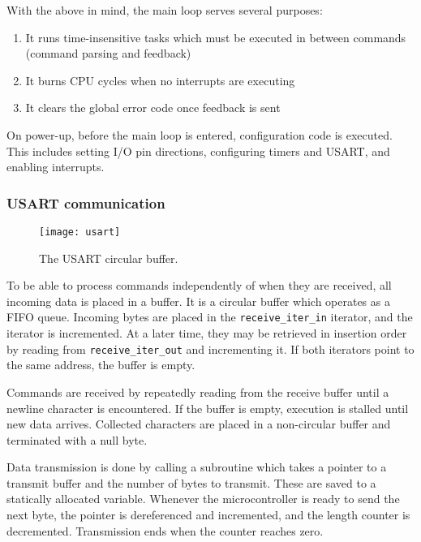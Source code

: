 With the above in mind, the main loop serves several purposes:
\begin{enumerate}
    \item It runs time-insensitive tasks which must be executed in between
    commands (command parsing and feedback)
    \item It burns CPU cycles when no interrupts are executing
    \item It clears the global error code once feedback is sent
\end{enumerate}

On power-up, before the main loop is entered, configuration code is executed.
This includes setting I/O pin directions, configuring timers and USART, and
enabling interrupts.

\subsubsection{USART communication}

\begin{figure}[ht]
    \begin{center}
        \texttt{[image: usart]}
        \caption{The USART circular buffer.}
    \end{center}
\end{figure}

To be able to process commands independently of when they are received, all
incoming data is placed in a buffer. It is a circular buffer which operates as a
FIFO queue. Incoming bytes are placed in the \texttt{receive\_iter\_in}
iterator, and the iterator is incremented. At a later time, they may be
retrieved in insertion order by reading from \texttt{receive\_iter\_out} and
incrementing it. If both iterators point to the same address, the buffer is
empty.

Commands are received by repeatedly reading from the receive buffer until a
newline character is encountered. If the buffer is empty, execution is stalled
until new data arrives. Collected characters are placed in a non-circular buffer
and terminated with a null byte.

Data transmission is done by calling a subroutine which takes a pointer to a
transmit buffer and the number of bytes to transmit. These are saved to a
statically allocated variable. Whenever the microcontroller is ready to send
the next byte, the pointer is dereferenced and incremented, and the length
counter is decremented. Transmission ends when the counter reaches zero.

